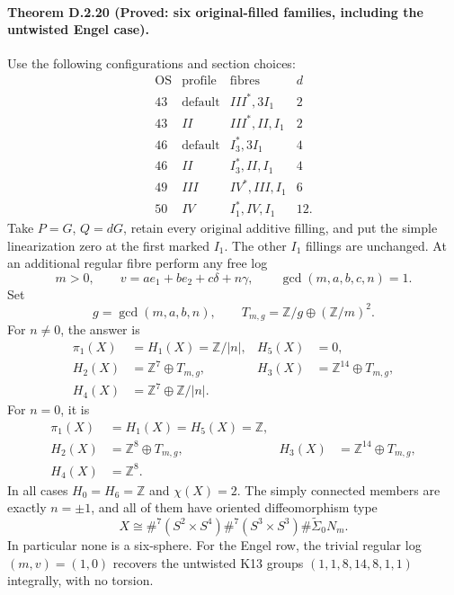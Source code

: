 \paragraph{Theorem D.2.20 (Proved: six original-filled families, including the untwisted Engel case).}
Use the following configurations and section choices:
\[
\begin{array}{c|c|l|r}
 \mathrm{OS}&\mathrm{profile}&\text{fibres}&d\\\hline
 43&\mathrm{default}&III^*,3I_1&2\\
 43&II&III^*,II,I_1&2\\
 46&\mathrm{default}&I_3^*,3I_1&4\\
 46&II&I_3^*,II,I_1&4\\
 49&III&IV^*,III,I_1&6\\
 50&IV&I_1^*,IV,I_1&12.
\end{array}
\]
Take $P=G$, $Q=dG$, retain every original additive filling,
and put the simple linearization zero at the first marked
$I_1$. The other $I_1$ fillings are unchanged. At an
additional regular fibre perform any free log
\[
 m>0,\qquad v=a e_1+b e_2+c\delta+n\gamma,
 \qquad\gcd(m,a,b,c,n)=1.
\]
Set
\[
        g=\gcd(m,a,b,n),\qquad
        T_{m,g}=\mathbb Z/g\oplus(\mathbb Z/m)^2.
\]
For $n\ne0$, the answer is
\[
\begin{aligned}
 \pi_1(X)&=H_1(X)=\mathbb Z/|n|, &H_5(X)&=0,\\
 H_2(X)&=\mathbb Z^7\oplus T_{m,g},
 &H_3(X)&=\mathbb Z^{14}\oplus T_{m,g},\\
 H_4(X)&=\mathbb Z^7\oplus\mathbb Z/|n|.
\end{aligned}
\tag{D.O1}
\]
For $n=0$, it is
\[
\begin{aligned}
 \pi_1(X)&=H_1(X)=H_5(X)=\mathbb Z,\\
 H_2(X)&=\mathbb Z^8\oplus T_{m,g},
 &H_3(X)&=\mathbb Z^{14}\oplus T_{m,g},\\
 H_4(X)&=\mathbb Z^8.
\end{aligned}
\tag{D.O2}
\]
In all cases $H_0=H_6=\mathbb Z$ and $\chi(X)=2$.
The simply connected members are exactly $n=\pm1$, and
all of them have oriented diffeomorphism type
\[
 X\cong\#^7(S^2\times S^4)\#^7(S^3\times S^3)
                                    \#\widetilde\Sigma_0N_m.
 \tag{D.O3}
\]
In particular none is a six-sphere. For the Engel row,
the trivial regular log $(m,v)=(1,0)$ recovers the
untwisted K13 groups $(1,1,8,14,8,1,1)$ integrally,
with no torsion.
